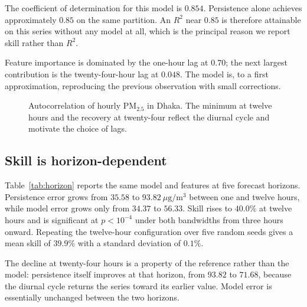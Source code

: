 \documentclass[conference,a4paper]{IEEEtran}
\begin{document}
The coefficient of determination for this model is $0.854$. Persistence alone
achieves approximately $0.85$ on the same partition. An $R^2$ near $0.85$ is therefore
attainable on this series without any model at all, which is the principal reason
we report skill rather than $R^2$.

Feature importance is dominated by the one-hour lag at $0.70$; the next largest
contribution is the twenty-four-hour lag at $0.048$. The model is, to a first
approximation, reproducing the previous observation with small corrections.

\begin{figure}[t]
\centering
{}
\caption{Autocorrelation of hourly PM$_{2.5}$ in Dhaka. The minimum at twelve
hours and the recovery at twenty-four reflect the diurnal cycle and motivate the
choice of lags.}
\label{fig:acf}
\end{figure}

\subsection{Skill is horizon-dependent}
Table~\ref{tab:horizon} reports the same model and features at five forecast
horizons. Persistence error grows from $35.58$ to $93.82~\mu\mathrm{g/m^3}$
between one and twelve hours, while model error grows only from $34.37$ to
$56.33$. Skill rises to $40.0\%$ at twelve hours and is significant at
$p<10^{-4}$ under both bandwidths from three hours onward. Repeating the
twelve-hour configuration over five random seeds gives a mean skill of $39.9\%$
with a standard deviation of $0.1\%$.

The decline at twenty-four hours is a property of the reference rather than the
model: persistence itself improves at that horizon, from $93.82$ to $71.68$,
because the diurnal cycle returns the series toward its earlier value. Model
error is essentially unchanged between the two horizons.
\end{document}

